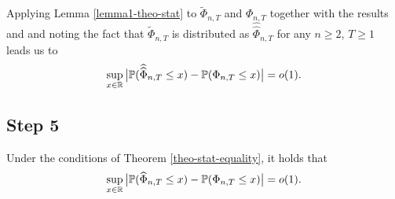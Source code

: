 \documentclass[a4paper,12pt]{article}
\makeatletter
\renewcommand{\eqref}[1]{\tagform@{\ref{#1}}}
\newcommand{\doublehattwo}[1]{\widehat{\widehat{#1}}}
\makeatother
\begin{document}
Applying Lemma \ref{lemma1-theo-stat} to $\widetilde{\Phi}_{n, T}$ and $\Phi_{n,T}$ together with the results \eqref{eq-strong-approx-equality} and \eqref{eq-anticon-equality} and noting the fact that $\widetilde{\Phi}_{n, T}$ is distributed as $\doublehattwo{\Phi}_{n, T}$ for any $n \ge 2$, $T \ge 1$ leads us to
\begin{equation*}\label{eq-}
\sup_{x \in \reals} \big| \pr(\doublehattwo{\Phi}_{n, T} \le x) - \pr(\Phi_{n,T} \le x) \big| = o(1). 
\end{equation*}

\subsection*{Step 5}
\begin{propA}\label{propA-gaussian-relation}
Under the conditions of Theorem \ref{theo-stat-equality}, it holds that 
\begin{equation}\label{eq-relation-gaussian}
\sup_{x \in \mathbb{R}} \big| \mathbb{P}(\widehat{\Phi}_{n, T} \le x) - \mathbb{P}(\Phi_{n,T} \le x) \big| = o(1).
\end{equation}
\end{propA}
\end{document}
